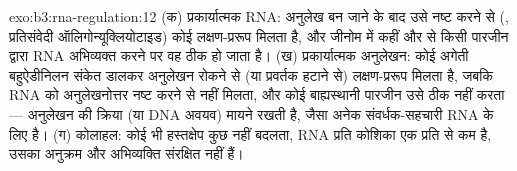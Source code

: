 \begin{solution}{exo:b3:rna-regulation:12}
(क) प्रकार्यात्मक RNA: अनुलेख बन जाने के बाद उसे नष्ट करने से (,
प्रतिसंवेदी ऑलिगोन्यूक्लियोटाइड) कोई लक्षण-प्ररूप मिलता है, और जीनोम
में कहीं और से किसी पारजीन द्वारा RNA अभिव्यक्त करने पर वह ठीक हो जाता
है। (ख) प्रकार्यात्मक अनुलेखन: कोई अगेती बहुऐडीनिलन संकेत डालकर
अनुलेखन रोकने से (या प्रवर्तक हटाने से) लक्षण-प्ररूप मिलता है, जबकि
RNA को अनुलेखनोत्तर नष्ट करने से नहीं मिलता, और कोई बाह्यस्थानी पारजीन
उसे ठीक नहीं करता --- अनुलेखन की क्रिया (या DNA अवयव) मायने रखती है,
जैसा अनेक संवर्धक-सहचारी RNA के लिए है। (ग) कोलाहल: कोई भी हस्तक्षेप
कुछ नहीं बदलता, RNA प्रति कोशिका एक प्रति से कम है, उसका अनुक्रम और
अभिव्यक्ति संरक्षित नहीं हैं।
\end{solution}

